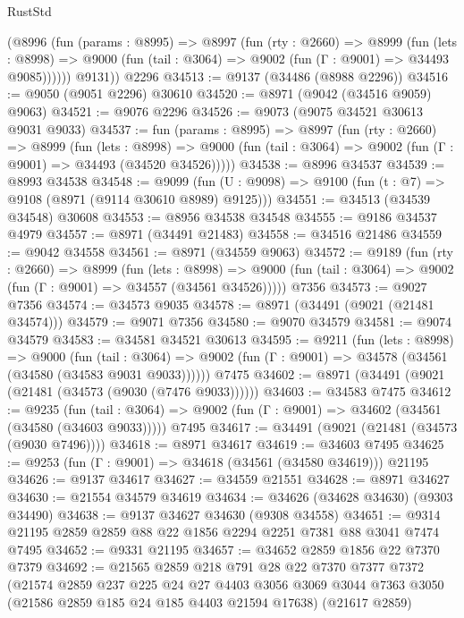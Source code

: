 \begin{lexlean}{RustStd}
\begin{coremodule}
        (@8996
          (fun (params : @8995) =>
          @8997
            (fun (rty : @2660) =>
            @8999
              (fun (lets : @8998) =>
              @9000 (fun (tail : @3064) => @9002 (fun (Γ : @9001) => @34493 @9085))))))
        @9131))
    @2296
@34513 := @9137 (@34486 (@8988 @2296))
@34516 := @9050 (@9051 @2296) @30610
@34520 := @8971 (@9042 (@34516 @9059) @9063)
@34521 := @9076 @2296
@34526 := @9073 (@9075 @34521 @30613 @9031 @9033)
@34537 := fun (params : @8995) =>
  @8997
    (fun (rty : @2660) =>
    @8999
      (fun (lets : @8998) =>
      @9000 (fun (tail : @3064) => @9002 (fun (Γ : @9001) => @34493 (@34520 @34526)))))
@34538 := @8996 @34537
@34539 := @8993 @34538
@34548 := @9099
    (fun (U : @9098) => @9100 (fun (t : @7) => @9108 (@8971 (@9114 @30610 @8989) @9125)))
@34551 := @34513 (@34539 @34548) @30608
@34553 := @8956 @34538 @34548
@34555 := @9186 @34537 @4979
@34557 := @8971 (@34491 @21483)
@34558 := @34516 @21486
@34559 := @9042 @34558
@34561 := @8971 (@34559 @9063)
@34572 := @9189
    (fun (rty : @2660) =>
    @8999
      (fun (lets : @8998) =>
      @9000 (fun (tail : @3064) => @9002 (fun (Γ : @9001) => @34557 (@34561 @34526)))))
    @7356
@34573 := @9027 @7356
@34574 := @34573 @9035
@34578 := @8971 (@34491 (@9021 (@21481 @34574)))
@34579 := @9071 @7356
@34580 := @9070 @34579
@34581 := @9074 @34579
@34583 := @34581 @34521 @30613
@34595 := @9211
    (fun (lets : @8998) =>
    @9000
      (fun (tail : @3064) =>
      @9002 (fun (Γ : @9001) => @34578 (@34561 (@34580 (@34583 @9031 @9033))))))
    @7475
@34602 := @8971 (@34491 (@9021 (@21481 (@34573 (@9030 (@7476 @9033))))))
@34603 := @34583 @7475
@34612 := @9235
    (fun (tail : @3064) => @9002 (fun (Γ : @9001) => @34602 (@34561 (@34580 (@34603 @9033)))))
    @7495
@34617 := @34491 (@9021 (@21481 (@34573 (@9030 @7496))))
@34618 := @8971 @34617
@34619 := @34603 @7495
@34625 := @9253 (fun (Γ : @9001) => @34618 (@34561 (@34580 @34619))) @21195
@34626 := @9137 @34617
@34627 := @34559 @21551
@34628 := @8971 @34627
@34630 := @21554 @34579 @34619
@34634 := @34626 (@34628 @34630) (@9303 @34490)
@34638 := @9137 @34627 @34630 (@9308 @34558)
@34651 := @9314 @21195 @2859 @2859 @88 @22 @1856 @2294 @2251 @7381 @88 @3041 @7474 @7495
@34652 := @9331 @21195
@34657 := @34652 @2859 @1856 @22 @7370 @7379
@34692 := @21565
    @2859
    @218
    @791
    @28
    @22
    @7370
    @7377
    @7372
    (@21574
      @2859
      @237
      @225
      @24
      @27
      @4403
      @3056
      @3069
      @3044
      @7363
      @3050
      (@21586 @2859 @185 @24 @185 @4403 @21594 @17638)
      (@21617 @2859)

\end{coremodule}
\end{lexlean}
